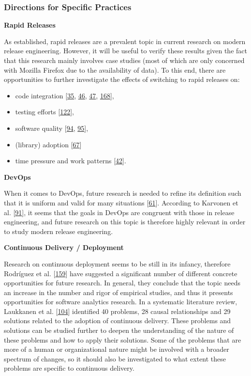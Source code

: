 \documentclass[]{book}
\providecommand{\tightlist}{%
  \setlength{\itemsep}{0pt}\setlength{\parskip}{0pt}}
\begin{document}
\subsubsection{Directions for Specific
Practices}\label{directions-for-specific-practices}

\textbf{Rapid Releases}

As established, rapid releases are a prevalent topic in current research
on modern release engineering. However, it will be useful to verify
these results given the fact that this research mainly involves case
studies (most of which are only concerned with Mozilla Firefox due to
the availability of data). To this end, there are opportunities to
further investigate the effects of switching to rapid releases on:

\begin{itemize}
\tightlist
\item
  code integration {[}\protect\hyperlink{ref-castelluccio2017a}{35},
  \protect\hyperlink{ref-da2014a}{46},
  \protect\hyperlink{ref-da2016a}{47},
  \protect\hyperlink{ref-souza2015a}{168}{]},
\item
  testing efforts {[}\protect\hyperlink{ref-mantyla2015a}{122}{]},
\item
  software quality {[}\protect\hyperlink{ref-khomh2015a}{94},
  \protect\hyperlink{ref-khomh2012a}{95}{]},
\item
  (library) adoption {[}\protect\hyperlink{ref-fujibayashi2017a}{67}{]}
\item
  time pressure and work patterns
  {[}\protect\hyperlink{ref-claes2017a}{42}{]}.
\end{itemize}

\textbf{DevOps}

When it comes to DevOps, future research is needed to refine its
definition such that it is uniform and valid for many situations
{[}\protect\hyperlink{ref-dyck2015a}{61}{]}. According to Karvonen et
al. {[}\protect\hyperlink{ref-karvonen2017a}{91}{]}, it seems that the
goals in DevOps are congruent with those in release engineering, and
future research on this topic is therefore highly relevant in order to
study modern release engineering.

\textbf{Continuous Delivery / Deployment}

Research on continuous deployment seems to be still in its infancy,
therefore Rodríguez et al.
{[}\protect\hyperlink{ref-rodriguez2017a}{159}{]} have suggested a
significant number of different concrete opportunities for future
research. In general, they conclude that the topic needs an increase in
the number and rigor of empirical studies, and thus it presents
opportunities for software analytics research. In a systematic
literature review, Laukkanen et al.
{[}\protect\hyperlink{ref-laukkanen2017a}{104}{]} identified 40
problems, 28 causal relationships and 29 solutions related to the
adoption of continuous delivery. These problems and solutions can be
studied further to deepen the understanding of the nature of these
problems and how to apply their solutions. Some of the problems that are
more of a human or organizational nature might be involved with a
broader spectrum of changes, so it should also be investigated to what
extent these problems are specific to continuous delivery.
\end{document}
